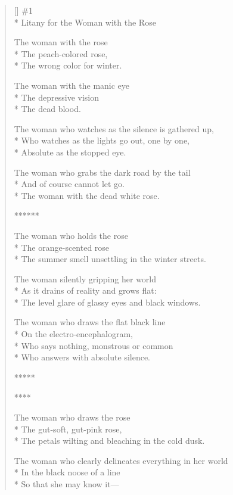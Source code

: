 \label{ch:litanies}
\settowidth{\versewidth}{             ---The woman with the black silhouette of crows on her soul,}
\begin{verse}[\versewidth]
\#1\\*
Litany for the Woman with the Rose

The woman with the rose\\*
The peach-colored rose,\\*
The wrong color for winter.

The woman with the manic eye\\*
The depressive vision\\*
The dead blood.

The woman who watches as the silence is gathered up,\\*
Who watches as the lights go out, one by one,\\*
Absolute as the stopped eye.

The woman who grabs the dark road by the tail\\*
And of course cannot let go.\\*
The woman with the dead white rose.

      ******

The woman who holds the rose\\*
The orange-scented rose\\*
The summer smell unsettling in the winter streets.

The woman silently gripping her world\\*
As it drains of reality and grows flat:\\*
The level glare of glassy eyes and black windows.

The woman who draws the flat black line\\*
On the electro-encephalogram,\\*
Who says nothing, monstrous or common\\*
Who answers with absolute silence.

     *****

 \qquad *****

The woman who draws the rose\\*
The gut-soft, gut-pink rose,\\*
The petals wilting and bleaching in the cold dusk.

The woman who clearly delineates everything in her world\\*
In the black noose of a line\\*
So that she may know it---


\end{verse}

